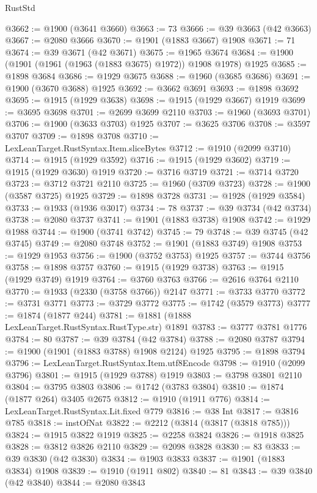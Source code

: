 \begin{lexlean}{RustStd}
\begin{coremodule}
@3662 := @1900 (@3641 @3660)
@3663 := 73
@3666 := @39 @3663 (@42 @3663)
@3667 := @2080 @3666
@3670 := @1901 (@1883 @3667) @1908
@3671 := 71
@3674 := @39 @3671 (@42 @3671)
@3675 := @1965 @3674
@3684 := @1900 (@1901 (@1961 (@1963 (@1883 @3675) @1972)) @1908 @1978) @1925
@3685 := @1898 @3684
@3686 := @1929 @3675
@3688 := @1960 (@3685 @3686)
@3691 := @1900 (@3670 @3688) @1925
@3692 := @3662 @3691
@3693 := @1898 @3692
@3695 := @1915 (@1929 @3638)
@3698 := @1915 (@1929 @3667) @1919
@3699 := @3695 @3698
@3701 := @2699 @3699 @2110
@3703 := @1960 (@3693 @3701)
@3706 := @1900 (@3633 @3703) @1925
@3707 := @3625 @3706
@3708 := @3597 @3707
@3709 := @1898 @3708
@3710 := LexLeanTarget.RustSyntax.Item.sliceBytes
@3712 := @1910 (@2099 @3710)
@3714 := @1915 (@1929 @3592)
@3716 := @1915 (@1929 @3602)
@3719 := @1915 (@1929 @3630) @1919
@3720 := @3716 @3719
@3721 := @3714 @3720
@3723 := @3712 @3721 @2110
@3725 := @1960 (@3709 @3723)
@3728 := @1900 (@3587 @3725) @1925
@3729 := @1898 @3728
@3731 := @1928 (@1929 @3584)
@3733 := @1933 (@1936 @3017)
@3734 := 78
@3737 := @39 @3734 (@42 @3734)
@3738 := @2080 @3737
@3741 := @1901 (@1883 @3738) @1908
@3742 := @1929 @1988
@3744 := @1900 (@3741 @3742)
@3745 := 79
@3748 := @39 @3745 (@42 @3745)
@3749 := @2080 @3748
@3752 := @1901 (@1883 @3749) @1908
@3753 := @1929 @1953
@3756 := @1900 (@3752 @3753) @1925
@3757 := @3744 @3756
@3758 := @1898 @3757
@3760 := @1915 (@1929 @3738)
@3763 := @1915 (@1929 @3749) @1919
@3764 := @3760 @3763
@3766 := @2616 @3764 @2110
@3770 := @1933 (@2330 (@3758 @3766)) @2147
@3771 := @3733 @3770
@3772 := @3731 @3771
@3773 := @3729 @3772
@3775 := @1742 (@3579 @3773)
@3777 := @1874 (@1877 @244)
@3781 := @1881 (@1888 LexLeanTarget.RustSyntax.RustType.str) @1891
@3783 := @3777 @3781 @1776
@3784 := 80
@3787 := @39 @3784 (@42 @3784)
@3788 := @2080 @3787
@3794 := @1900 (@1901 (@1883 @3788) @1908 @2124) @1925
@3795 := @1898 @3794
@3796 := LexLeanTarget.RustSyntax.Item.utf8Encode
@3798 := @1910 (@2099 @3796)
@3801 := @1915 (@1929 @3788) @1919
@3803 := @3798 @3801 @2110
@3804 := @3795 @3803
@3806 := @1742 (@3783 @3804)
@3810 := @1874 (@1877 @264) @3405 @2675
@3812 := @1910 (@1911 @776)
@3814 := LexLeanTarget.RustSyntax.Lit.fixed @779
@3816 := @38 Int
@3817 := @3816 @785
@3818 := instOfNat
@3822 := @2212 (@3814 (@3817 (@3818 @785)))
@3824 := @1915 @3822 @1919
@3825 := @2258 @3824
@3826 := @1918 @3825
@3828 := @3812 @3826 @2110
@3829 := @2098 @3828
@3830 := 83
@3833 := @39 @3830 (@42 @3830)
@3834 := @1903 @3833
@3837 := @1901 (@1883 @3834) @1908
@3839 := @1910 (@1911 @802)
@3840 := 81
@3843 := @39 @3840 (@42 @3840)
@3844 := @2080 @3843

\end{coremodule}
\end{lexlean}

